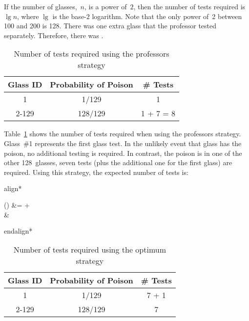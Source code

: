 \documentclass{report}
\newenvironment{aligncustom}
{ \csname align*\endcsname %
    \centering
}
{
  \csname endalign*\endcsname
}
\begin{document}
  If the number of glasses,~$n$, is a power of~$2$, then the number of tests required is $\lg n$, where $\lg$ is the base-$2$ logarithm.  Note that the only power of~2 between 100 and 200 is 128.  There was one extra glass that the professor tested separately.  Therefore, there was .
  
  \begin{table}[h]
    \centering
    \begin{tabular}{c|c|c}
      \hline
      Glass ID & Probability of Poison & \# Tests  \\\hline
      1        & 1/129                 & 1         \\\hline
      2-129    & 128/129               & 1 + 7 = 8 \\\hline
    \end{tabular}
    \caption{Number of tests required using the professors strategy}\label{tab:problem5.9.20-Prof}
  \end{table}
  
  Table~\ref{tab:problem5.9.20-Prof} shows the number of tests required when using the professors strategy.  Glass~\#1 represents the first glass test.  In the unlikely event that glass has the poison, no additional testing is required. In contrast, the poison is in one of the other 128~glasses, seven tests (plus the additional one for the first glass) are required.  Using this strategy, the expected number of tests is:
  
  \begin{aligncustom}
    () &=   +   \\
                                            &\approx {} 
  \end{aligncustom}
  
  \begin{table}[h]
    \centering
    \begin{tabular}{c|c|c}
      \hline
      Glass ID & Probability of Poison & \# Tests  \\\hline
      1        & 1/129                 & 7 + 1     \\\hline
      2-129    & 128/129               & 7         \\\hline
    \end{tabular}
    \caption{Number of tests required using the optimum strategy}\label{tab:problem5.9.20-Opt}
  \end{table}
  
\end{document}
